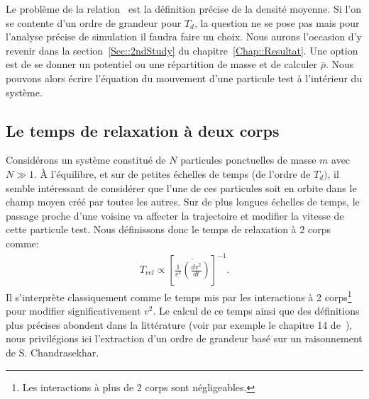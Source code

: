 Le problème de la relation~ est la définition précise de la densité moyenne. Si l'on se contente d'un ordre de grandeur pour $T_d$,
la question ne se pose pas mais pour l'analyse précise de simulation il faudra faire un choix. Nous aurons l'occasion d'y revenir dans la
section~\ref{Sec::2ndStudy} du chapitre~\ref{Chap::Resultat}.
Une option est de se donner un potentiel ou une répartition de masse et de calculer $\bar{\rho}$. %
Nous pouvons alors écrire l'équation du mouvement d'une particule test à l'intérieur du système.





\subsection{Le temps de relaxation à deux corps}

Considérons un système constitué de $N$ particules ponctuelles de masse $m$ avec $N\gg1$. À l'équilibre, et sur de petites échelles de temps (de
l'ordre de $T_{d})$, il semble intéressant de considérer que l'une de ces particules soit en orbite dans le champ moyen créé par toutes les autres. Sur
de plus longues échelles de temps, le passage proche d'une voisine va affecter la trajectoire et modifier la vitesse de cette
particule test. Nous définissons donc le temps de relaxation à 2 corps comme:
\begin{align}
	T_{rel}\propto\left[  \overline{\frac{1}{v^{2}}\left(  \frac{dv^{2}}{dt}\right)  }\right]  ^{-1}. \label{TREL}%
\end{align}
Il s'interprète classiquement comme le temps mis par les interactions à 2 corps\footnote{Les interactions à plus de 2 corps sont négligeables.} pour modifier significativement
$v^{2}$. Le calcul de ce temps ainsi que des définitions plus précises abondent dans la littérature (voir par exemple le chapitre 14 de\ \cite{HH}),
nous privilégions ici l'extraction d'un ordre de grandeur basé sur un raisonnement de S. Chandrasekhar.

